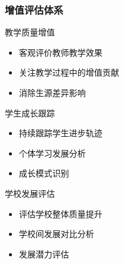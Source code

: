 \documentclass[aspectratio=169]{beamer}
\begin{document}
\begin{frame}
    \frametitle{增值评估体系}
    \begin{block}{教学质量增值}
        \begin{itemize}
            \item 客观评价教师教学效果
            \item 关注教学过程中的增值贡献
            \item 消除生源差异影响
        \end{itemize}
    \end{block}
    
    \begin{block}{学生成长跟踪}
        \begin{itemize}
            \item 持续跟踪学生进步轨迹
            \item 个体学习发展分析
            \item 成长模式识别
        \end{itemize}
    \end{block}
    
    \begin{block}{学校发展评估}
        \begin{itemize}
            \item 评估学校整体质量提升
            \item 学校间发展对比分析
            \item 发展潜力评估
        \end{itemize}
    \end{block}
\end{frame}
\end{document}
